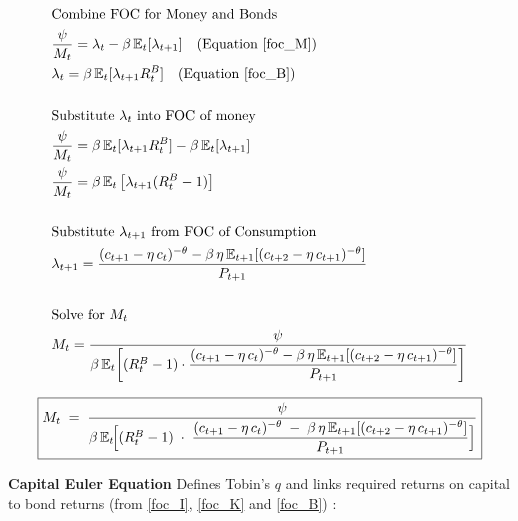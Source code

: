 \documentclass[11pt,preprint]{elsarticle}
\numberwithin{equation}{section}
\numberwithin{figure}{section}
\numberwithin{table}{section}
\begin{document}
\begin{align*}
& \text{Combine FOC for Money and Bonds} \\
& \frac{\psi}{M_t} = \lambda_t - \beta\,\mathbb{E}_t[\lambda_{t+1}] \quad \text{(Equation \ref{foc_M})} \\
& \lambda_t = \beta\,\mathbb{E}_t[\lambda_{t+1}R_t^B] \quad \text{(Equation \ref{foc_B})} \\
& \\
& \text{Substitute } \lambda_t \text{ into FOC of money} \\
& \frac{\psi}{M_t} = \beta\,\mathbb{E}_t[\lambda_{t+1}R_t^B] - \beta\,\mathbb{E}_t[\lambda_{t+1}] \\
& \frac{\psi}{M_t} = \beta\,\mathbb{E}_t\left[\lambda_{t+1}(R_t^B - 1)\right] \\
& \\
& \text{Substitute } \lambda_{t+1} \text{ from FOC of Consumption} \\
& \lambda_{t+1} = \frac{(c_{t+1} - \eta\,c_t)^{-\theta} - \beta\,\eta\,\mathbb{E}_{t+1}[(c_{t+2} - \eta\,c_{t+1})^{-\theta}]}{P_{t+1}} \\
& \\
& \text{Solve for } M_t \\
& M_t = \frac{\psi}{\beta\,\mathbb{E}_t\!\left[ (R_t^B - 1) \cdot \dfrac{(c_{t+1} - \eta\,c_t)^{-\theta} - \beta\,\eta\,\mathbb{E}_{t+1}[(c_{t+2} - \eta\,c_{t+1})^{-\theta}]}{P_{t+1}} \right]}
\end{align*}

\begin{equation}\label{money_demand_app}
\boxed{
  M_t
  \;=\;
  \frac{\psi}
       {\beta\,\mathbb{E}_t\!\Bigl[
         (R_t^B - 1)
         \;\cdot\;
         \dfrac{(c_{t+1} - \eta\,c_t)^{-\theta}
               \;-\;
               \beta\,\eta\,\mathbb{E}_{t+1}[(c_{t+2} - \eta\,c_{t+1})^{-\theta}]}
              {P_{t+1}}
       \Bigr]}
}
\end{equation}

\textbf{Capital Euler Equation } Defines Tobin's \(q\) and links
required returns on capital to bond returns (from \eqref{foc_I},
\eqref{foc_K} and \eqref{foc_B}) :
\end{document}
